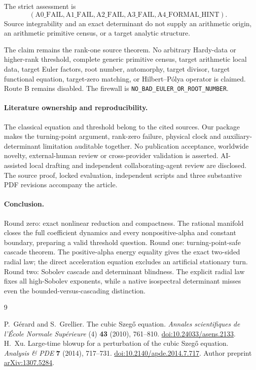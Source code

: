 \documentclass[10pt]{article}
\begin{document}
The strict assessment is
\[
 (\mathrm{A0\_FAIL},\mathrm{A1\_FAIL},\mathrm{A2\_FAIL},
   \mathrm{A3\_FAIL},\mathrm{A4\_FORMAL\_HINT}).
\]
Source integrability and an exact determinant do not supply an arithmetic
origin, an arithmetic primitive census, or a target analytic structure.
\fi

\begin{samepage}
The claim remains the rank-one source theorem. No arbitrary Hardy-data or
higher-rank threshold, complete generic primitive census, target arithmetic
local data, target Euler factors, root number, automorphy, target divisor,
target functional equation, target-zero matching, or Hilbert--P\'olya operator
is claimed. Route B remains disabled. The firewall is
\texttt{NO\_BAD\_EULER\_OR\_ROOT\_NUMBER}.
\end{samepage}

\paragraph{Literature ownership and reproducibility.}
The classical equation and threshold belong to the cited sources.
Our package makes the turning-point argument, rank-zero failure, physical
clock and auxiliary-determinant limitation auditable together.
No publication acceptance, worldwide novelty, external-human review or
cross-provider validation is asserted. AI-assisted local drafting and
independent collaborating-agent review are disclosed.
The source proof, locked evaluation, independent scripts and three
substantive PDF revisions accompany the article.

\paragraph{Conclusion.}
\ifcase\CRevisionRound
Round zero: exact nonlinear reduction and compactness.
The rational manifold closes the full coefficient dynamics and every
nonpositive-alpha and constant boundary, preparing a valid threshold question.
\or
Round one: turning-point-safe cascade theorem.
The positive-alpha energy equality gives the exact two-sided radial law;
the direct acceleration equation excludes an artificial stationary turn.
\else
Round two: Sobolev cascade and determinant blindness.
The explicit radial law fixes all high-Sobolev exponents, while a native
isospectral determinant misses even the bounded-versus-cascading distinction.
\fi

\begin{thebibliography}{9}
\raggedright
{}
P.~G\'erard and S.~Grellier.
The cubic Szeg\H{o} equation.
\emph{Annales scientifiques de l'\'Ecole Normale Sup\'erieure}
(4) \textbf{43} (2010), 761--810.
\href{https://doi.org/10.24033/asens.2133}{doi:10.24033/asens.2133}.
H.~Xu.
Large-time blowup for a perturbation of the cubic Szeg\H{o} equation.
\emph{Analysis \& PDE} \textbf{7} (2014), 717--731.
\href{https://doi.org/10.2140/apde.2014.7.717}{doi:10.2140/apde.2014.7.717}.
Author preprint \href{https://arxiv.org/abs/1307.5284}{arXiv:1307.5284}.
\end{thebibliography}
\end{document}
